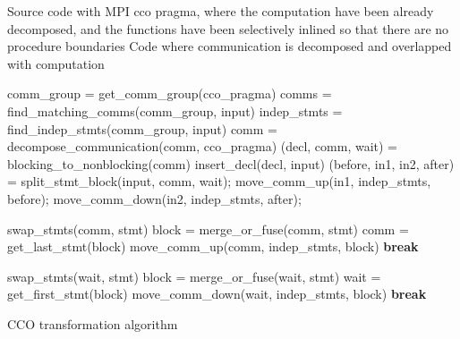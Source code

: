 
\begin{algorithm}
{\scriptsize
\begin{algorithmic}
\Require Source code with MPI cco pragma,
\State where the computation have been already decomposed, and
\State the functions have been selectively inlined so that there are no procedure boundaries
\Ensure Code where communication is decomposed and overlapped with computation

  \State comm\_group = get\_comm\_group(cco\_pragma) %
  \State comms = find\_matching\_comms(comm\_group, input) %
  \State indep\_stmts = find\_indep\_stmts(comm\_group, input) %
      \State comm = decompose\_communication(comm, cco\_pragma)
    \EndIf
    \State (decl, comm, wait) = blocking\_to\_nonblocking(comm) %
    \State insert\_decl(decl, input)
    \State (before, in1, in2, after) = split\_stmt\_block(input, comm, wait);
    \State move\_comm\_up(in1, indep\_stmts, before);
    \State move\_comm\_down(in2, indep\_stmts, after);
  \EndFor
\EndFunction

      \State swap\_stmts(comm, stmt)
    \Else
        \State block = merge\_or\_fuse(comm, stmt)
        \State comm = get\_last\_stmt(block)
        \State move\_comm\_up(comm, indep\_stmts, block)
      \EndIf
      \State \textbf{break}
    \EndIf
  \EndFor
\EndFunction

      \State swap\_stmts(wait, stmt)
    \Else
        \State block = merge\_or\_fuse(wait, stmt)
        \State wait = get\_first\_stmt(block)
        \State move\_comm\_down(wait, indep\_stmts, block)
      \EndIf
      \State \textbf{break}
    \EndIf
  \EndFor
\EndFunction

\end{algorithmic}
\caption{CCO transformation algorithm}
\label{alg:cco}
}%
\end{algorithm}

